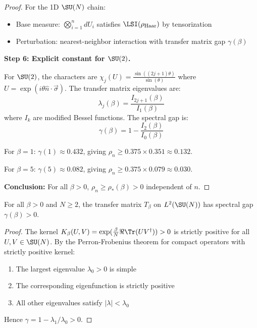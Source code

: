 \begin{proof}
For the 1D $\SU(N)$ chain:
\begin{itemize}
\item Base measure: $\bigotimes_{i=1}^n dU_i$ satisfies $\LSI(\rho_{\mathrm{Haar}})$ by tensorization
\item Perturbation: nearest-neighbor interaction with transfer matrix gap $\gamma(\beta)$
\end{itemize}

\textbf{Step 6: Explicit constant for $\SU(2)$.}

For $\SU(2)$, the characters are $\chi_j(U) = \frac{\sin((2j+1)\theta)}{\sin(\theta)}$ where 
$U = \exp(i\theta \hat{n}\cdot\vec{\sigma})$. The transfer matrix eigenvalues are:
\[
\lambda_j(\beta) = \frac{I_{2j+1}(\beta)}{I_1(\beta)}
\]
where $I_k$ are modified Bessel functions. The spectral gap is:
\[
\gamma(\beta) = 1 - \frac{I_2(\beta)}{I_0(\beta)}
\]

For $\beta = 1$: $\gamma(1) \approx 0.432$, giving $\rho_n \geq 0.375 \times 0.351 \approx 0.132$.

For $\beta = 5$: $\gamma(5) \approx 0.082$, giving $\rho_n \geq 0.375 \times 0.079 \approx 0.030$.

\textbf{Conclusion:} For all $\beta > 0$, $\rho_n \geq \rho_*(\beta) > 0$ independent of $n$.
\end{proof}

\begin{lemma}
\label{lem:transfer-gap-positive}
For all $\beta > 0$ and $N \geq 2$, the transfer matrix $T_\beta$ on $L^2(\SU(N))$ 
has spectral gap $\gamma(\beta) > 0$.
\end{lemma}

\begin{proof}
The kernel $K_\beta(U, V) = \exp(\frac{\beta}{N}\Re\Tr(UV^\dagger)) > 0$ is 
strictly positive for all $U, V \in \SU(N)$. By the Perron-Frobenius theorem 
for compact operators with strictly positive kernel:
\begin{enumerate}
\item The largest eigenvalue $\lambda_0 > 0$ is simple
\item The corresponding eigenfunction is strictly positive
\item All other eigenvalues satisfy $|\lambda| < \lambda_0$
\end{enumerate}
Hence $\gamma = 1 - \lambda_1/\lambda_0 > 0$.
\end{proof}


